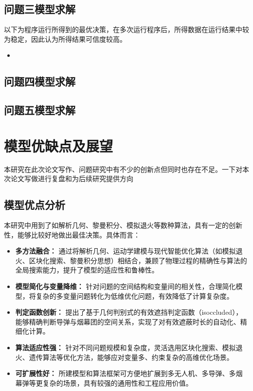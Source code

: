 \documentclass{article}
\begin{document}
\subsection{问题三模型求解}
以下为程序运行所得到的最优决策，在多次运行程序后，所得数据在运行结果中较为稳定，因此认为所得结果可信度较高。

\begin{itemize}
    \item 
\end{itemize}



\subsection{问题四模型求解}

\subsection{问题五模型求解}

\section{模型优缺点及展望}
本研究在此次论文写作、问题研究中有不少的创新点但同时也存在不足。一下对本次论文写做进行复盘和为后续研究提供方向

\subsection{模型优点分析}

本研究中用到了如解析几何、黎曼积分、模拟退火等数种算法，具有一定的创新性，能够比较好地做出最佳决策。具体而言：

\begin{itemize}
    \item \textbf{多方法融合：} 通过将解析几何、运动学建模与现代智能优化算法（如模拟退火、区块化搜索、黎曼积分思想）相结合，兼顾了物理过程的精确性与算法的全局搜索能力，提升了模型的适应性和鲁棒性。
    \item \textbf{模型简化与变量降维：} 针对问题的空间结构和变量间的相关性，合理简化模型，将复杂的多变量问题转化为低维优化问题，有效降低了计算复杂度。
    \item \textbf{判定函数创新：} 提出了基于几何判别式的有效遮挡判定函数（isoccluded），能够精确判断导弹与烟幕团的空间关系，实现了对有效遮蔽时长的自动化、精细化计算。
    \item \textbf{算法适应性强：} 针对不同问题规模和复杂度，灵活选用区块化搜索、模拟退火、遗传算法等优化方法，能够应对变量多、约束复杂的高维优化场景。
    \item \textbf{可扩展性好：} 所建模型和算法框架可方便地扩展到多无人机、多导弹、多烟幕弹等更复杂的场景，具有较强的通用性和工程应用价值。
\end{itemize}
\end{document}
